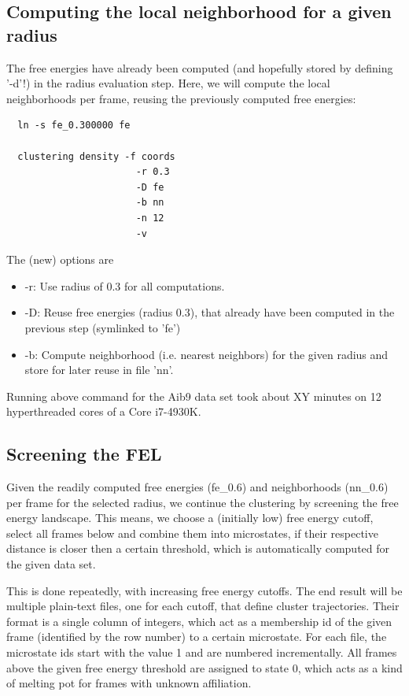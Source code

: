 \documentclass[12pt,a4paper,twoside,english,fleqn]{article}
\begin{document}
\subsection{Computing the local neighborhood for a given radius}
The free energies have already been computed (and hopefully stored by defining
'-d'!) in the radius evaluation step.
Here, we will compute the local neighborhoods per frame, reusing the previously
computed free energies:
\begin{lstlisting}
  ln -s fe_0.300000 fe

  clustering density -f coords
                       -r 0.3
                       -D fe
                       -b nn
                       -n 12
                       -v
\end{lstlisting}
The (new) options are
\begin{itemize}
  \item -r: Use radius of 0.3 for all computations.
  \item -D: Reuse free energies (radius 0.3), that already have been
            computed in the previous step (symlinked to 'fe')
  \item -b: Compute neighborhood (i.e. nearest neighbors) for the given
            radius and store for later reuse in file 'nn'.
\end{itemize}


\begin{mdframed}[innertopmargin=20pt]
  Running above command for the Aib9 data set took about XY minutes on
  12 hyperthreaded cores of a Core i7-4930K.
\end{mdframed}




\subsection{Screening the FEL\label{sec:screening}}
Given the readily computed free energies (fe\_0.6) and neighborhoods (nn\_0.6)
per frame for the selected radius,
we continue the clustering by screening the free energy landscape.
This means, we choose a (initially low) free energy cutoff, select all frames
below and combine them into microstates, if their respective distance is closer
then a certain threshold, which is automatically computed for the given data
set.

This is done repeatedly, with increasing free energy cutoffs.
The end result will be multiple plain-text files, one for each cutoff, that
define cluster trajectories. Their format is a single column of integers, which
act as a membership id of the given frame (identified by the row number) to
a certain microstate.
For each file, the microstate ids start with the value 1 and are numbered
incrementally. All frames above the given free energy threshold are assigned to
state 0, which acts as a kind of melting pot for frames with unknown
affiliation.
\end{document}
